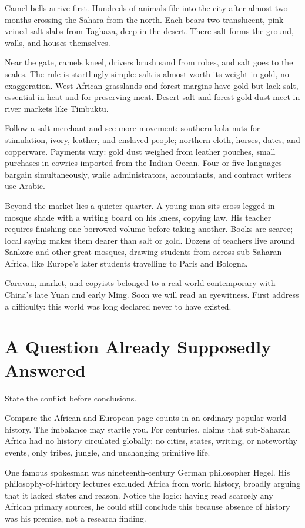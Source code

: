 Camel bells arrive first. Hundreds of animals file into the city after almost two months crossing the Sahara from the north. Each bears two translucent, pink-veined salt slabs from Taghaza, deep in the desert. There salt forms the ground, walls, and houses themselves.

Near the gate, camels kneel, drivers brush sand from robes, and salt goes to the scales. The rule is startlingly simple: salt is almost worth its weight in gold, no exaggeration. West African grasslands and forest margins have gold but lack salt, essential in heat and for preserving meat. Desert salt and forest gold dust meet in river markets like Timbuktu.

Follow a salt merchant and see more movement: southern kola nuts for stimulation, ivory, leather, and enslaved people; northern cloth, horses, dates, and copperware. Payments vary: gold dust weighed from leather pouches, small purchases in cowries imported from the Indian Ocean. Four or five languages bargain simultaneously, while administrators, accountants, and contract writers use Arabic.

Beyond the market lies a quieter quarter. A young man sits cross-legged in mosque shade with a writing board on his knees, copying law. His teacher requires finishing one borrowed volume before taking another. Books are scarce; local saying makes them dearer than salt or gold. Dozens of teachers live around Sankore and other great mosques, drawing students from across sub-Saharan Africa, like Europe's later students travelling to Paris and Bologna.

Caravan, market, and copyists belonged to a real world contemporary with China's late Yuan and early Ming. Soon we will read an eyewitness. First address a difficulty: this world was long declared never to have existed.

\section{A Question Already Supposedly Answered}
State the conflict before conclusions.

Compare the African and European page counts in an ordinary popular world history. The imbalance may startle you. For centuries, claims that sub-Saharan Africa had no history circulated globally: no cities, states, writing, or noteworthy events, only tribes, jungle, and unchanging primitive life.

One famous spokesman was nineteenth-century German philosopher Hegel. His philosophy-of-history lectures excluded Africa from world history, broadly arguing that it lacked states and reason. Notice the logic: having read scarcely any African primary sources, he could still conclude this because absence of history was his premise, not a research finding.

